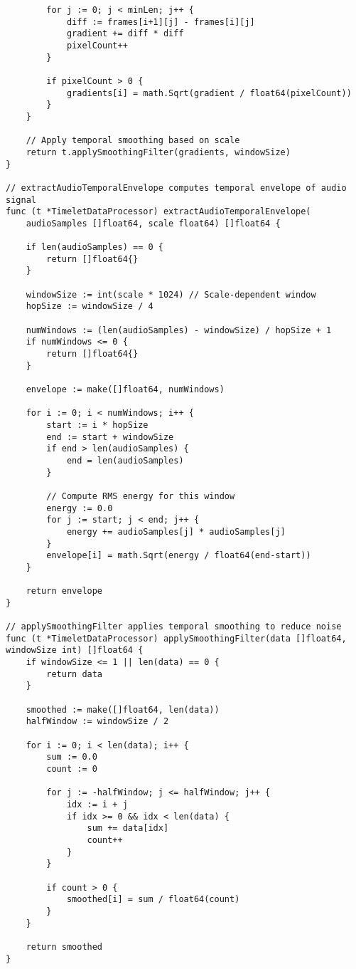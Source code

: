 \begin{tcolorbox}[colback=CodeBackground, colframe=DarkGray, title=Parallel Feature Extraction, fonttitle=\bfseries]
\begin{verbatim}
        for j := 0; j < minLen; j++ {
            diff := frames[i+1][j] - frames[i][j]
            gradient += diff * diff
            pixelCount++
        }
        
        if pixelCount > 0 {
            gradients[i] = math.Sqrt(gradient / float64(pixelCount))
        }
    }
    
    // Apply temporal smoothing based on scale
    return t.applySmoothingFilter(gradients, windowSize)
}

// extractAudioTemporalEnvelope computes temporal envelope of audio signal
func (t *TimeletDataProcessor) extractAudioTemporalEnvelope(
    audioSamples []float64, scale float64) []float64 {
    
    if len(audioSamples) == 0 {
        return []float64{}
    }
    
    windowSize := int(scale * 1024) // Scale-dependent window
    hopSize := windowSize / 4
    
    numWindows := (len(audioSamples) - windowSize) / hopSize + 1
    if numWindows <= 0 {
        return []float64{}
    }
    
    envelope := make([]float64, numWindows)
    
    for i := 0; i < numWindows; i++ {
        start := i * hopSize
        end := start + windowSize
        if end > len(audioSamples) {
            end = len(audioSamples)
        }
        
        // Compute RMS energy for this window
        energy := 0.0
        for j := start; j < end; j++ {
            energy += audioSamples[j] * audioSamples[j]
        }
        envelope[i] = math.Sqrt(energy / float64(end-start))
    }
    
    return envelope
}

// applySmoothingFilter applies temporal smoothing to reduce noise
func (t *TimeletDataProcessor) applySmoothingFilter(data []float64, windowSize int) []float64 {
    if windowSize <= 1 || len(data) == 0 {
        return data
    }
    
    smoothed := make([]float64, len(data))
    halfWindow := windowSize / 2
    
    for i := 0; i < len(data); i++ {
        sum := 0.0
        count := 0
        
        for j := -halfWindow; j <= halfWindow; j++ {
            idx := i + j
            if idx >= 0 && idx < len(data) {
                sum += data[idx]
                count++
            }
        }
        
        if count > 0 {
            smoothed[i] = sum / float64(count)
        }
    }
    
    return smoothed
}
\end{verbatim}
\end{tcolorbox}

